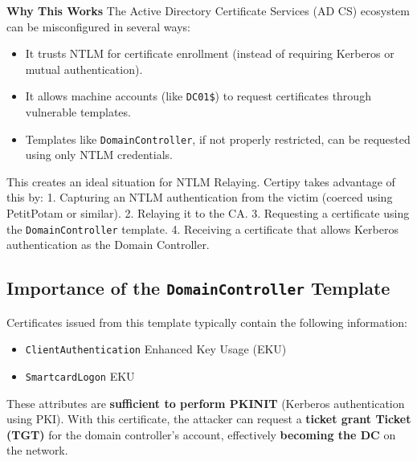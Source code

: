 \begin{notebox}
    \textbf{Why This Works}
    The Active Directory Certificate Services (AD CS) ecosystem can be misconfigured in several ways: \begin{itemize}
        \item It trusts NTLM for certificate enrollment (instead of requiring Kerberos or mutual authentication).
        \item It allows machine accounts (like \texttt{DC01\$}) to request certificates through vulnerable templates.
        \item Templates like \texttt{DomainController}, if not properly restricted, can be requested using only NTLM credentials.
    \end{itemize}
\end{notebox}
This creates an ideal situation for NTLM Relaying. Certipy takes advantage of this by:
1. Capturing an NTLM authentication from the victim (coerced using PetitPotam or similar).
2. Relaying it to the CA.
3. Requesting a certificate using the \texttt{DomainController} template.
4. Receiving a certificate that allows Kerberos authentication as the Domain Controller.

\subsection{Importance of the \verb|DomainController| Template}

Certificates issued from this template typically contain the following information:
\begin{itemize}
    \item \verb|ClientAuthentication| Enhanced Key Usage (EKU)
    \item \verb|SmartcardLogon| EKU
\end{itemize}
These attributes are \textbf{sufficient to perform PKINIT} (Kerberos authentication using PKI). With this certificate, the attacker can request a \textbf{ ticket grant Ticket (TGT)} for the domain controller's account, effectively \textbf{ becoming the DC} on the network.

